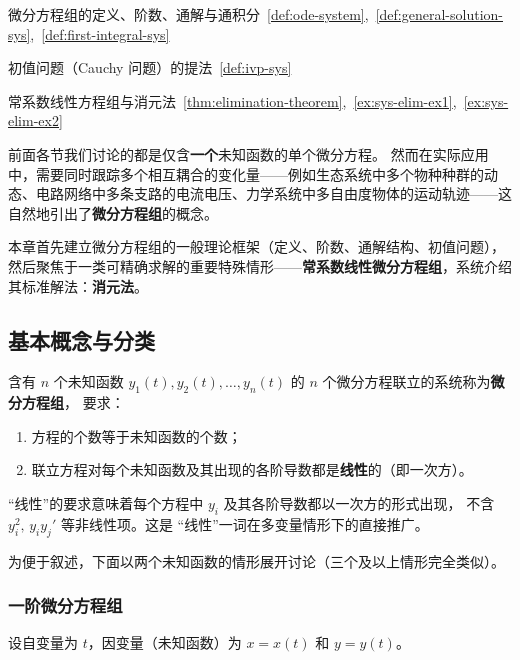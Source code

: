 \documentclass[lang=cn,11pt]{elegantbook}
\begin{document}
\begin{introduction}
  \item 微分方程组的定义、阶数、通解与通积分~\ref{def:ode-system},~\ref{def:general-solution-sys},~\ref{def:first-integral-sys}
  \item 初值问题（Cauchy 问题）的提法~\ref{def:ivp-sys}
  \item 常系数线性方程组与消元法~\ref{thm:elimination-theorem},~\ref{ex:sys-elim-ex1},~\ref{ex:sys-elim-ex2}
\end{introduction}

前面各节我们讨论的都是仅含\textbf{一个}未知函数的单个微分方程。
然而在实际应用中，需要同时跟踪多个相互耦合的变化量——例如生态系统中多个物种种群的动态、电路网络中多条支路的电流电压、力学系统中多自由度物体的运动轨迹——这自然地引出了\textbf{微分方程组}的概念。

本章首先建立微分方程组的一般理论框架（定义、阶数、通解结构、初值问题），然后聚焦于一类可精确求解的重要特殊情形——\textbf{常系数线性微分方程组}，系统介绍其标准解法：\textbf{消元法}。


\subsection{基本概念与分类}

\begin{definition}[微分方程组] \label{def:ode-system}
含有 $n$ 个未知函数 $y_1(t),y_2(t),\dots,y_n(t)$ 的 $n$ 个微分方程联立的系统称为\textbf{微分方程组}，
要求：
\begin{enumerate}
  \item 方程的个数等于未知函数的个数；
  \item 联立方程对每个未知函数及其出现的各阶导数都是\textbf{线性}的（即一次方）。
\end{enumerate}
\end{definition}

``线性''的要求意味着每个方程中 $y_i$ 及其各阶导数都以一次方的形式出现，
不含 $y_i^2,\,y_iy_j'$ 等非线性项。这是 ``线性''一词在多变量情形下的直接推广。

为便于叙述，下面以两个未知函数的情形展开讨论（三个及以上情形完全类似）。


\subsubsection*{一阶微分方程组}

设自变量为 $t$，因变量（未知函数）为 $x=x(t)$ 和 $y=y(t)$。
\end{document}
